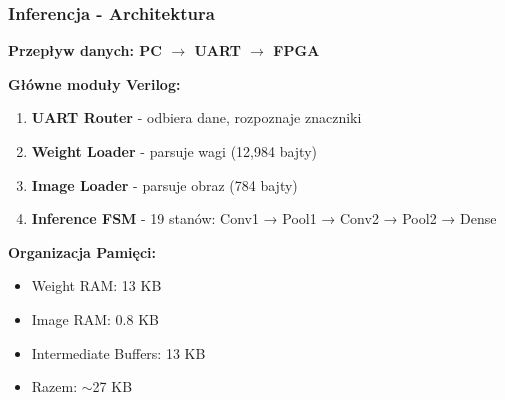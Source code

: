 \documentclass{beamer}
\begin{document}
\begin{frame}
  \frametitle{Inferencja - Architektura}

  \textbf{Przepływ danych: PC $\rightarrow$ UART $\rightarrow$ FPGA}

  \vspace{0.3cm}

  \textbf{Główne moduły Verilog:}
  \begin{enumerate}
    \item \textbf{UART Router} - odbiera dane, rozpoznaje znaczniki
    \item \textbf{Weight Loader} - parsuje wagi (12,984 bajty)
    \item \textbf{Image Loader} - parsuje obraz (784 bajty)
    \item \textbf{Inference FSM} - 19 stanów: Conv1 → Pool1 → Conv2 → Pool2 → Dense
  \end{enumerate}

  \vspace{0.3cm}

  \textbf{Organizacja Pamięci:}
  \begin{itemize}
    \item Weight RAM: 13 KB
    \item Image RAM: 0.8 KB
    \item Intermediate Buffers: 13 KB
    \item Razem: $\sim$27 KB 
  \end{itemize}

  \vspace{0.3cm}

\end{frame}
\end{document}
